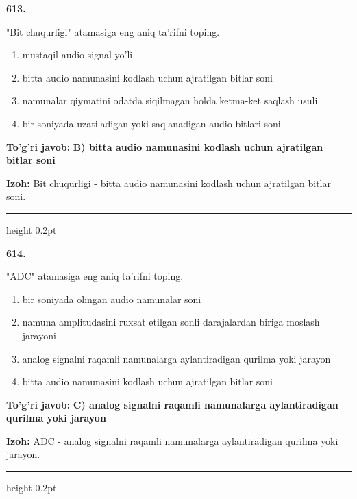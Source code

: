 \documentclass[10pt,a4paper,oneside]{article}
\begin{document}
\noindent\textbf{\color{ink}613.}
\par
"Bit chuqurligi" atamasiga eng aniq ta'rifni toping.
\begin{enumerate}[label=\Alph*),leftmargin=9mm]
\item mustaqil audio signal yo'li
\item bitta audio namunasini kodlash uchun ajratilgan bitlar soni
\item namunalar qiymatini odatda siqilmagan holda ketma-ket saqlash usuli
\item bir soniyada uzatiladigan yoki saqlanadigan audio bitlari soni
\end{enumerate}
\begin{tcolorbox}[enhanced,breakable,colback=teal!4,colframe=teal!50!black,boxrule=0.5pt,arc=1.1mm,left=3mm,right=3mm,top=1.7mm,bottom=1.7mm,before skip=2mm,after skip=2mm]
\textbf{\color{teal}To'g'ri javob:} \textbf{B) bitta audio namunasini kodlash uchun ajratilgan bitlar soni}
\par\smallskip
\textbf{Izoh:} Bit chuqurligi - bitta audio namunasini kodlash uchun ajratilgan bitlar soni.
\end{tcolorbox}
\vspace{2mm}\hrule height 0.2pt \vspace{3mm}

\noindent\textbf{\color{ink}614.}
\par
"ADC" atamasiga eng aniq ta'rifni toping.
\begin{enumerate}[label=\Alph*),leftmargin=9mm]
\item bir soniyada olingan audio namunalar soni
\item namuna amplitudasini ruxsat etilgan sonli darajalardan biriga moslash jarayoni
\item analog signalni raqamli namunalarga aylantiradigan qurilma yoki jarayon
\item bitta audio namunasini kodlash uchun ajratilgan bitlar soni
\end{enumerate}
\begin{tcolorbox}[enhanced,breakable,colback=teal!4,colframe=teal!50!black,boxrule=0.5pt,arc=1.1mm,left=3mm,right=3mm,top=1.7mm,bottom=1.7mm,before skip=2mm,after skip=2mm]
\textbf{\color{teal}To'g'ri javob:} \textbf{C) analog signalni raqamli namunalarga aylantiradigan qurilma yoki jarayon}
\par\smallskip
\textbf{Izoh:} ADC - analog signalni raqamli namunalarga aylantiradigan qurilma yoki jarayon.
\end{tcolorbox}
\vspace{2mm}\hrule height 0.2pt \vspace{3mm}
\end{document}
